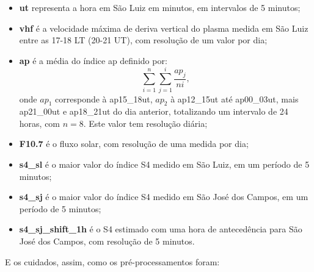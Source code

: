 \begin{itemize}
\item {\bf ut} representa a hora em São Luiz em minutos, em intervalos de 5 minutos;
\item {\bf vhf} é a velocidade máxima de deriva vertical do plasma medida em São Luiz entre as 17-18 LT (20-21 UT), com resolução de um valor por dia;
\item {\bf ap} é a média do índice ap definido por:
\begin{equation}
\sum_{i=1}^{n}\sum_{j=1}^{i}\frac{ap_{j}}{ni}\mbox{,}~
\end{equation}
onde $ap_1$ corresponde à ap15\_18ut, $ap_2$ à ap12\_15ut até ap00\_03ut, mais ap21\_00ut e ap18\_21ut do dia anterior, totalizando um intervalo de 24 horas, com $n=8$. Este valor tem resolução diária;
\item {\bf F10.7} é o fluxo solar, com resolução de uma medida por dia;
\item {\bf s4\_sl} é o maior valor do índice S4 medido em São Luiz, em um período de 5 minutos;
\item {\bf s4\_sj} é o maior valor do índice S4 medido em São José dos Campos, em um período de 5 minutos;
\item {\bf s4\_sj\_shift\_1h} é o S4 estimado com uma hora de antecedência para São José dos Campos, com resolução de 5 minutos.
\end{itemize}

E os cuidados, assim, como os pré-processamentos foram:

